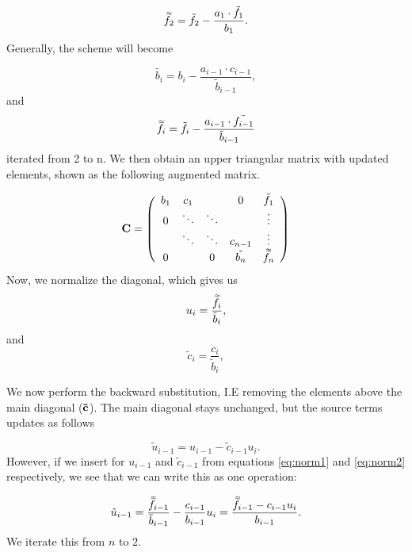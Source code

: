 \documentclass{emulateapj}
\newcommand{\dbtilde}[1]{\accentset{\approx}{#1}}
\begin{document}
\begin{equation}
    \dbtilde{f_2} = \tilde{f_2} - \frac{a_1 \cdot \tilde{f_1}}{b_1}.
\end{equation}
Generally, the scheme will become

\begin{equation} \label{eq:fgen1}
    \tilde{b_i} = b_i - \frac{a_{i-1} \cdot c_{i-1}}{\tilde{b}_{i-1}},
\end{equation}
and
\begin{equation} \label{eq:fgen2}
    \dbtilde{f_{i}} = \tilde{f_{i}} - \frac{a_{i-1} \cdot \tilde{f_{i-1}}}{\tilde{b}_{i-1}}
\end{equation}
iterated from 2 to n. We then obtain an upper triangular matrix with updated elements, shown as the following augmented matrix.

\begin{equation}
    \bold{C} = \left( \begin{array}{ccccc}
b_{1} & c_1 & & 0 & \tilde{f_1} \\
0 & \ddots & \ddots & & \vdots \\
& \ddots & \ddots & c_{n-1} & \vdots \\
0 & & 0 & \tilde{b_{n}} & \dbtilde{f_n} \end{array} \right)
\end{equation}
Now, we normalize the diagonal, which gives us
\begin{equation} \label{eq:norm1}
    {u}_{i} = \frac{\dbtilde{f}_{i}}{\tilde{b}_i},
\end{equation}
and
\begin{equation} \label{eq:norm2}
    \tilde{c}_{i} = \frac{{c}_{i}}{\tilde{b}_i},
\end{equation}

We now perform the backward substitution, I.E removing the elements above the main diagonal ($\bold{\tilde{c}}$). The main diagonal stays unchanged, but the source terms updates as follows

\begin{equation}
    \tilde{u}_{i-1} = u_{i-1} - \tilde{c}_{i-1} u_i.
\end{equation}
However, if we insert for $u_{i-1}$ and $\tilde{c}_{i-1}$ from equations \ref{eq:norm1} and \ref{eq:norm2} respectively, we see that we can write this as one operation:

\begin{equation} \label{eq:finalback}
    \tilde{u}_{i-1} = \frac{\dbtilde{f}_{i-1}}{\tilde{b}_{i-1}} - \frac{c_{i-1}}{b_{i-1}} u_i = \frac{\dbtilde{f}_{i-1} -c_{i-1}u_i }{b_{i-1}}.
\end{equation}
We iterate this from $n$ to $2$.
\end{document}
